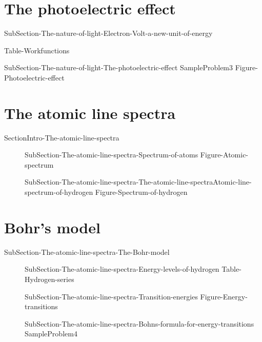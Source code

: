 \documentclass[main.tex]{subfiles}
\newcommand\chapterlabel{Ch-radiation}\setcounter{figurenewcounter}{0}\setcounter{tablenewcounter}{0}\setcounter{formulanewcounter}{0}\chapterpicture{../{\chapterlabel}/figure1}\chapterpicturelabel{PngImg}
\begin{document}
\section{The photoelectric effect} 
{SubSection-The-nature-of-light-Electron-Volt-a-new-unit-of-energy}
 \sloppy\begin{description}
{Table-Workfunctions}
\item[\docfilehook{The photoelectric effect}{ }]{SubSection-The-nature-of-light-The-photoelectric-effect}
{SampleProblem3}
{Figure-Photoelectric-effect}
\end{description}

 \section{The atomic line spectra}
{SectionIntro-The-atomic-line-spectra}
\sloppy\begin{description}
\item[]{SubSection-The-atomic-line-spectra-Spectrum-of-atoms}
{Figure-Atomic-spectrum}
\item[]{SubSection-The-atomic-line-spectra-The-atomic-line-spectraAtomic-line-spectrum-of-hydrogen}
{Figure-Spectrum-of-hydrogen}
\end{description}

\section{Bohr's model}{SubSection-The-atomic-line-spectra-The-Bohr-model}
\sloppy\begin{description}
\item[]{SubSection-The-atomic-line-spectra-Energy-levels-of-hydrogen}
\vspace{-0.5cm}{Figure-Energy-levels-of-hydrogen}
{Table-Hydrogen-series}
\item[]{SubSection-The-atomic-line-spectra-Transition-energies}
{Figure-Energy-transitions}
\item[]{SubSection-The-atomic-line-spectra-Bohns-formula-for-energy-transitions}
{SampleProblem4}
\end{description}
\end{document}
